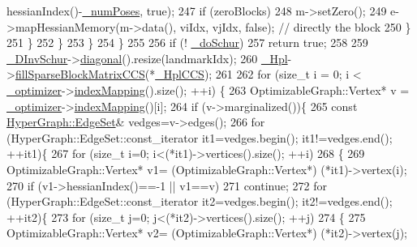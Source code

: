 \begin{DoxyCode}
      hessianIndex()-\hyperlink{classg2o_1_1BlockSolver_a709259fc290d746f4174d25410b7458a}{\_numPoses}, \textcolor{keyword}{true});
247             \textcolor{keywordflow}{if} (zeroBlocks)
248               m->setZero();
249             e->mapHessianMemory(m->data(), viIdx, vjIdx, \textcolor{keyword}{false}); \textcolor{comment}{// directly the block}
250           \}
251         \}
252       \}
253     \}
254   \}
255 
256   \textcolor{keywordflow}{if} (! \hyperlink{classg2o_1_1BlockSolver_ab375a5fac964182442f38288bd8a103a}{\_doSchur})
257     \textcolor{keywordflow}{return} \textcolor{keyword}{true};
258 
259   \hyperlink{classg2o_1_1BlockSolver_ad6a1a8f17c8fb854962a8204c79bc981}{\_DInvSchur}->\hyperlink{classg2o_1_1SparseBlockMatrixDiagonal_a762097ac116728fec0cc64cf05610a96}{diagonal}().resize(landmarkIdx);
260   \hyperlink{classg2o_1_1BlockSolver_a0f6051339990e95aa587145a8a6f4f5f}{\_Hpl}->\hyperlink{classg2o_1_1SparseBlockMatrix_a1f596d1bd27de9f62282eee7e65a9f27}{fillSparseBlockMatrixCCS}(*\hyperlink{classg2o_1_1BlockSolver_ab54eb7bb13f8b3a8a5f135a98f2050ec}{\_HplCCS});
261 
262   \textcolor{keywordflow}{for} (\textcolor{keywordtype}{size\_t} i = 0; i < \hyperlink{classg2o_1_1Solver_aff3275985d996329df15070348c21292}{\_optimizer}->\hyperlink{classg2o_1_1SparseOptimizer_a5e98a5f879f04c013b20f9c39a9057da}{indexMapping}().size(); ++i) \{
263     OptimizableGraph::Vertex* v = \hyperlink{classg2o_1_1Solver_aff3275985d996329df15070348c21292}{\_optimizer}->\hyperlink{classg2o_1_1SparseOptimizer_a5e98a5f879f04c013b20f9c39a9057da}{indexMapping}()[i];
264     \textcolor{keywordflow}{if} (v->marginalized())\{
265       \textcolor{keyword}{const} \hyperlink{classg2o_1_1HyperGraph_a5e2970e236c0dcb4eff7c205d7b6b4ae}{HyperGraph::EdgeSet}& vedges=v->edges();
266       \textcolor{keywordflow}{for} (HyperGraph::EdgeSet::const\_iterator it1=vedges.begin(); it1!=vedges.end(); ++it1)\{
267         \textcolor{keywordflow}{for} (\textcolor{keywordtype}{size\_t} i=0; i<(*it1)->vertices().size(); ++i)
268         \{
269           OptimizableGraph::Vertex* v1= (OptimizableGraph::Vertex*) (*it1)->vertex(i);
270           \textcolor{keywordflow}{if} (v1->hessianIndex()==-1 || v1==v)
271             \textcolor{keywordflow}{continue};
272           \textcolor{keywordflow}{for}  (HyperGraph::EdgeSet::const\_iterator it2=vedges.begin(); it2!=vedges.end(); ++it2)\{
273             \textcolor{keywordflow}{for} (\textcolor{keywordtype}{size\_t} j=0; j<(*it2)->vertices().size(); ++j)
274             \{
275               OptimizableGraph::Vertex* v2= (OptimizableGraph::Vertex*) (*it2)->vertex(j);

\end{DoxyCode}
